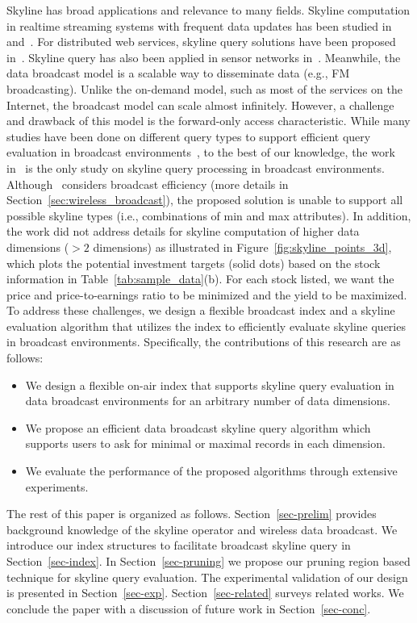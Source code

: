Skyline has broad applications and relevance to many fields.
Skyline computation in realtime streaming systems with frequent
data updates has been studied in~\cite{conf/icde/LinYWL05}
and~\cite{journals/tkde/TaoP06}. For distributed web services,
skyline query solutions have been proposed
in~\cite{conf/edbt/BalkeGZ04}. Skyline query has also been applied
in sensor networks in~\cite{conf/cikm/ChenLY09}. Meanwhile, the
data broadcast model is a scalable way to disseminate data (e.g.,
FM broadcasting). Unlike the on-demand model, such as most of the
services on the Internet, the broadcast model can scale almost
infinitely. However, a challenge and drawback of this model is the
forward-only access characteristic. While many studies have been
done on different query types to support efficient query
evaluation in broadcast
environments~\cite{conf/dexa/HaKCL09,conf/icde/KuZW07,journals/tmc/KuZW08,
journals/vldb/ZhengLLLS09,conf/cikm/Hara02}, to the best of our
knowledge, the work in~\cite{conf/dexa/HaKCL09} is the only study
on skyline query processing in broadcast environments.
Although~\cite{conf/dexa/HaKCL09} considers broadcast efficiency
(more details in Section~\ref{sec:wireless_broadcast}), the
proposed solution is unable to support all possible skyline types
(i.e., combinations of min and max attributes). In addition, the
work did not address details for skyline computation of higher
data dimensions ($>2$ dimensions) as illustrated in
Figure~\ref{fig:skyline_points_3d}, which plots the potential
investment targets (solid dots) based on the stock information in
Table~\ref{tab:sample_data}(b). For each stock listed, we want the
price and price-to-earnings ratio to be minimized and the yield to
be maximized. To address these challenges, we design a flexible
broadcast index and a skyline evaluation algorithm that utilizes
the index to efficiently evaluate skyline queries in broadcast
environments. Specifically, the contributions of this research are
as follows:

\begin{itemize}
\item We design a flexible on-air index that supports skyline
query evaluation in data broadcast environments for an arbitrary
number of data dimensions.

\item We propose an efficient data broadcast skyline query
algorithm which supports users to ask for minimal or maximal
records in each dimension.

\item We evaluate the performance of the proposed algorithms
through extensive experiments.
\end{itemize}

The rest of this paper is organized as follows.
Section~\ref{sec-prelim} provides background knowledge of the
skyline operator and wireless data broadcast. We introduce our
index structures to facilitate broadcast skyline query in
Section~\ref{sec-index}. In Section~\ref{sec-pruning} we propose
our pruning region based technique for skyline query evaluation.
The experimental validation of our design is presented in
Section~\ref{sec-exp}. Section~\ref{sec-related} surveys related
works. We conclude the paper with a discussion of future work in
Section~\ref{sec-conc}.

